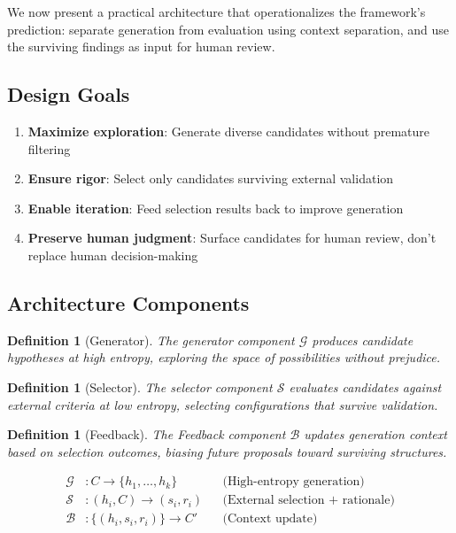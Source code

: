 \documentclass[11pt]{article}
\newtheorem{definition}[theorem]{Definition}
\begin{document}
We now present a practical architecture that operationalizes the framework's prediction: separate generation from evaluation using context separation, and use the surviving findings as input for human review.

\subsection{Design Goals}

\begin{enumerate}
    \item \textbf{Maximize exploration}: Generate diverse candidates without premature filtering
    \item \textbf{Ensure rigor}: Select only candidates surviving external validation
    \item \textbf{Enable iteration}: Feed selection results back to improve generation
    \item \textbf{Preserve human judgment}: Surface candidates for human review, don't replace human decision-making
\end{enumerate}

\subsection{Architecture Components}

\begin{definition}[Generator]
The generator component $\mathcal{G}$ produces candidate hypotheses at high entropy, exploring the space of possibilities without prejudice.
\end{definition}

\begin{definition}[Selector]
The selector component $\mathcal{S}$ evaluates candidates against external criteria at low entropy, selecting configurations that survive validation.
\end{definition}

\begin{definition}[Feedback]
The Feedback component $\mathcal{B}$ updates generation context based on selection outcomes, biasing future proposals toward surviving structures.
\end{definition}

\begin{equation}
\boxed{
\begin{aligned}
\mathcal{G}&: C \to \{h_1, \ldots, h_k\} && \text{(High-entropy generation)} \\
\mathcal{S}&: (h_i, C) \to (s_i, r_i) && \text{(External selection + rationale)} \\
\mathcal{B}&: \{(h_i, s_i, r_i)\} \to C' && \text{(Context update)}
\end{aligned}
}
\end{equation}
\end{document}
